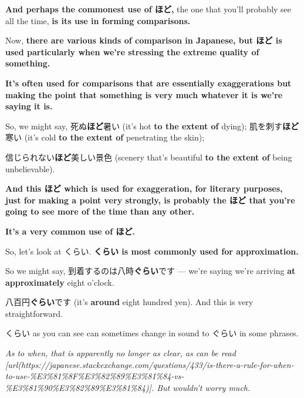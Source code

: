 \stopsectionlevel

\startsectionlevel[title={ほど for forming comparisons},reference={ほど-for-forming-comparisons}]

{\bf And perhaps the commonest use of ほど,} the one that you'll probably see all the time, {\bf is its use in forming comparisons.}

Now, {\bf there are various kinds of comparison in Japanese, but ほど is used particularly when we're stressing the extreme quality of something.}

{\bf It's often used for comparisons that are essentially exaggerations but making the point that something is very much whatever it is we're saying it is.}

So, we might say, 死ぬ{\bf ほど}暑い (it's hot {\bf to the extent of} dying); 肌を刺す{\bf ほど}寒い (it's cold {\bf to the extent of} penetrating the skin);

{}

信じられない{\bf ほど}美しい景色 (scenery that's beautiful {\bf to the extent of} being unbelievable).

\thinrule

{\bf And this ほど which is used for exaggeration, for literary purposes, just for making a point very strongly, is probably the ほど that you're going to see more of the time than any other.}

{\bf It's a very common use of ほど.}

\stopsectionlevel

\stopsectionlevel

\startsectionlevel[title={くらい},reference={くらい}]

So, let's look at くらい. {\bf くらい is most commonly used for approximation.}

So we might say, 到着するのは八時{\bf ぐらい}です --- we're saying we're arriving {\bf at approximately} eight o'clock.

{}

八百円{\bf ぐらい}です (it's {\bf around} eight hundred yen). And this is very straightforward.

くらい as you can see can sometimes change in sound to ぐらい in some phrases.

{\em As to when, that is apparently no longer as clear, as can be read [url(https://japanese.stackexchange.com/questions/433/is-there-a-rule-for-when-to-use-\%E3\%81\%8F\%E3\%82\%89\%E3\%81\%84-vs-\%E3\%81\%90\%E3\%82\%89\%E3\%81\%84)]. But wouldn't worry much.}

